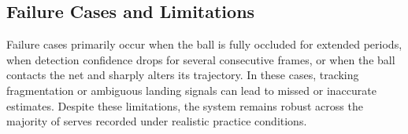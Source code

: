 \subsection{Failure Cases and Limitations}
Failure cases primarily occur when the ball is fully occluded for extended periods, when detection confidence drops for several consecutive frames, or when the ball contacts the net and sharply alters its trajectory. In these cases, tracking fragmentation or ambiguous landing signals can lead to missed or inaccurate estimates. Despite these limitations, the system remains robust across the majority of serves recorded under realistic practice conditions.
